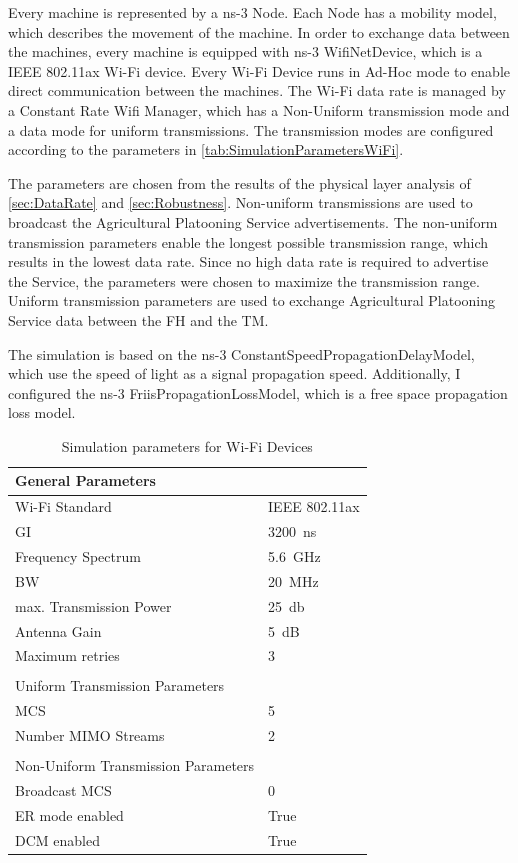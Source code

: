 Every machine is represented by a ns-3 Node.
Each Node has a mobility model, which describes the movement of the machine.
In order to exchange data between the machines, every machine is equipped with ns-3 WifiNetDevice, which is a IEEE 802.11ax
Wi-Fi device.
Every Wi-Fi Device runs in Ad-Hoc mode to enable direct communication
between the machines.
The Wi-Fi data rate is managed by a Constant Rate Wifi Manager, which has a Non-Uniform
transmission mode and a data mode for uniform transmissions.
The transmission modes are configured according
to the parameters in \autoref{tab:SimulationParametersWiFi}.

The parameters are chosen from the results of the physical layer analysis of
\autoref{sec:DataRate} and \autoref{sec:Robustness}.
Non-uniform transmissions are used to broadcast the Agricultural Platooning
Service advertisements.
The non-uniform transmission parameters enable the longest possible
transmission range, which results in the lowest data rate.
Since no high data rate is required to advertise the Service, the parameters were
chosen to maximize the transmission range.
Uniform transmission parameters are used to exchange Agricultural Platooning Service data between
the \ac{FH} and the \ac{TM}. 

The simulation is based on the ns-3 ConstantSpeedPropagationDelayModel, which use the speed of light as a signal
propagation speed.
Additionally, I configured  the ns-3 FriisPropagationLossModel, which is a free space propagation loss model.

\begin{table}[H]
	\centering
	\begin{tabular}{p{6cm}p{4cm}}
		General Parameters & \\
		\midrule
		Wi-Fi Standard & IEEE 802.11ax\\
		\ac{GI} & \SI{3200}{\nano\second}\\
		Frequency Spectrum & \SI{5.6}{\giga\hertz}\\
		\ac{BW} & \SI{20}{\mega\hertz}\\
		max. Transmission Power & \SI{25}{\decibel}\\
		Antenna Gain & \SI{5}{\dB}\\
		Maximum retries & \num{3}\\
		 & \\
		Uniform Transmission Parameters & \\
		\midrule
		\ac{MCS} & \num{5}\\
		Number \ac{MIMO} Streams & \num{2}\\
		 & \\
		Non-Uniform Transmission Parameters & \\
		\midrule
		Broadcast \ac{MCS} & \num{0}\\
		\ac{ER} mode enabled & True\\
		\ac{DCM} enabled & True\\
	\end{tabular}
	\caption{Simulation parameters for Wi-Fi Devices}
	\label{tab:SimulationParametersWiFi}
\end{table}

